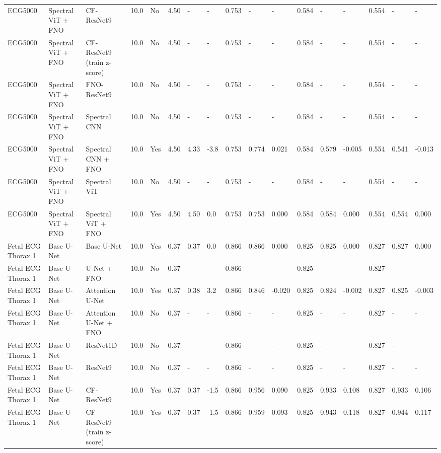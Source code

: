 \begin{longtable}{lllllllllllllllll}
ECG5000 & Spectral ViT + FNO & CF-ResNet9 & 10.0 & No & 4.50 & - & - & 0.753 & - & - & 0.584 & - & - & 0.554 & - & - \\
ECG5000 & Spectral ViT + FNO & CF-ResNet9 (train z-score) & 10.0 & No & 4.50 & - & - & 0.753 & - & - & 0.584 & - & - & 0.554 & - & - \\
ECG5000 & Spectral ViT + FNO & FNO-ResNet9 & 10.0 & No & 4.50 & - & - & 0.753 & - & - & 0.584 & - & - & 0.554 & - & - \\
ECG5000 & Spectral ViT + FNO & Spectral CNN & 10.0 & No & 4.50 & - & - & 0.753 & - & - & 0.584 & - & - & 0.554 & - & - \\
ECG5000 & Spectral ViT + FNO & Spectral CNN + FNO & 10.0 & Yes & 4.50 & 4.33 & -3.8 & 0.753 & 0.774 & 0.021 & 0.584 & 0.579 & -0.005 & 0.554 & 0.541 & -0.013 \\
ECG5000 & Spectral ViT + FNO & Spectral ViT & 10.0 & No & 4.50 & - & - & 0.753 & - & - & 0.584 & - & - & 0.554 & - & - \\
ECG5000 & Spectral ViT + FNO & Spectral ViT + FNO & 10.0 & Yes & 4.50 & 4.50 & 0.0 & 0.753 & 0.753 & 0.000 & 0.584 & 0.584 & 0.000 & 0.554 & 0.554 & 0.000 \\
Fetal ECG Thorax 1 & Base U-Net & Base U-Net & 10.0 & Yes & 0.37 & 0.37 & 0.0 & 0.866 & 0.866 & 0.000 & 0.825 & 0.825 & 0.000 & 0.827 & 0.827 & 0.000 \\
Fetal ECG Thorax 1 & Base U-Net & U-Net + FNO & 10.0 & No & 0.37 & - & - & 0.866 & - & - & 0.825 & - & - & 0.827 & - & - \\
Fetal ECG Thorax 1 & Base U-Net & Attention U-Net & 10.0 & Yes & 0.37 & 0.38 & 3.2 & 0.866 & 0.846 & -0.020 & 0.825 & 0.824 & -0.002 & 0.827 & 0.825 & -0.003 \\
Fetal ECG Thorax 1 & Base U-Net & Attention U-Net + FNO & 10.0 & No & 0.37 & - & - & 0.866 & - & - & 0.825 & - & - & 0.827 & - & - \\
Fetal ECG Thorax 1 & Base U-Net & ResNet1D & 10.0 & No & 0.37 & - & - & 0.866 & - & - & 0.825 & - & - & 0.827 & - & - \\
Fetal ECG Thorax 1 & Base U-Net & ResNet9 & 10.0 & No & 0.37 & - & - & 0.866 & - & - & 0.825 & - & - & 0.827 & - & - \\
Fetal ECG Thorax 1 & Base U-Net & CF-ResNet9 & 10.0 & Yes & 0.37 & 0.37 & -1.5 & 0.866 & 0.956 & 0.090 & 0.825 & 0.933 & 0.108 & 0.827 & 0.933 & 0.106 \\
Fetal ECG Thorax 1 & Base U-Net & CF-ResNet9 (train z-score) & 10.0 & Yes & 0.37 & 0.37 & -1.5 & 0.866 & 0.959 & 0.093 & 0.825 & 0.943 & 0.118 & 0.827 & 0.944 & 0.117 \\

\end{longtable}
